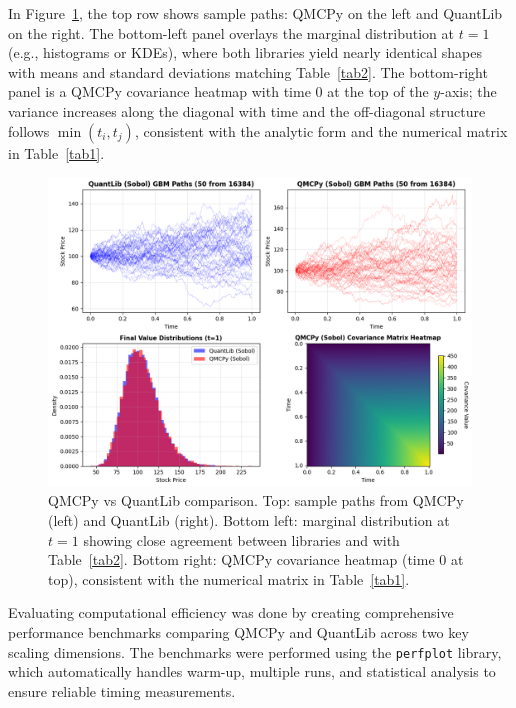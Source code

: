 

 In Figure~\ref{fig:qmcpy_quantlib_comparison}, the top row shows sample paths:
 QMCPy on the left and QuantLib on the right. The bottom-left panel overlays the
 marginal distribution at $t=1$ (e.g., histograms or KDEs), where both libraries
 yield nearly identical shapes with means and standard deviations matching
 Table~\ref{tab2}. The bottom-right panel is a QMCPy covariance heatmap with
 time 0 at the top of the $y$-axis; the variance increases along the diagonal
 with time and the off-diagonal structure follows $\min(t_i,t_j)$, consistent
 with the analytic form and the numerical matrix in Table~\ref{tab1}.

\begin{figure}[h]
\centering
\includegraphics[width=1\textwidth]{GBM/images/figure_5.png}
\caption{QMCPy vs QuantLib comparison. Top: sample paths from QMCPy (left) and
QuantLib (right). Bottom left: marginal distribution at $t=1$ showing close
agreement between libraries and with Table~\ref{tab2}. Bottom right: QMCPy
covariance heatmap (time 0 at top), consistent with the numerical matrix in
Table~\ref{tab1}.}
\label{fig:qmcpy_quantlib_comparison}
\end{figure}

Evaluating computational efficiency was done by creating comprehensive
performance benchmarks comparing QMCPy and QuantLib across two key scaling
dimensions. The benchmarks were performed using the \texttt{perfplot} library,
which automatically handles warm-up, multiple runs, and statistical analysis to
ensure reliable timing measurements. 

